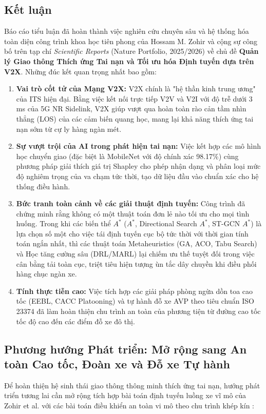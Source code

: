 \documentclass[a4paper]{article}
\begin{document}
\subsection{Kết luận}
Báo cáo tiểu luận đã hoàn thành việc nghiên cứu chuyên sâu và hệ thống hóa toàn diện công trình khoa học tiên phong của Hossam M. Zohir và cộng sự công bố trên tạp chí \textit{Scientific Reports} (Nature Portfolio, 2025/2026) về chủ đề \textbf{Quản lý Giao thông Thích ứng Tai nạn và Tối ưu hóa Định tuyến dựa trên V2X}. Những đúc kết quan trọng nhất bao gồm:
\begin{enumerate}
    \item \textbf{Vai trò cốt tử của Mạng V2X:} V2X chính là "hệ thần kinh trung ương" của ITS hiện đại. Bằng việc kết nối trực tiếp V2V và V2I với độ trễ dưới 3 ms của 5G NR Sidelink, V2X giúp vượt qua hoàn toàn rào cản tầm nhìn thẳng (LOS) của các cảm biến quang học, mang lại khả năng thích ứng tai nạn sớm từ cự ly hàng ngàn mét.
    \item \textbf{Sự vượt trội của AI trong phát hiện tai nạn:} Việc kết hợp các mô hình học chuyển giao (đặc biệt là MobileNet với độ chính xác 98.17\%) cùng phương pháp giải thích giá trị Shapley cho phép nhận dạng và phân loại mức độ nghiêm trọng của va chạm tức thời, tạo dữ liệu đầu vào chuẩn xác cho hệ thống điều hành.
    \item \textbf{Bức tranh toàn cảnh về các giải thuật định tuyến:} Công trình đã chứng minh rằng không có một thuật toán đơn lẻ nào tối ưu cho mọi tình huống. Trong khi các biến thể $A^*$ ($A^*$, Directional Search $A^*$, ST-GCN $A^*$) là lựa chọn số một cho việc tái định tuyến cục bộ tức thời với thời gian tính toán ngắn nhất, thì các thuật toán Metaheuristics (GA, ACO, Tabu Search) và Học tăng cường sâu (DRL/MARL) lại chiếm ưu thế tuyệt đối trong việc cân bằng tải toàn cục, triệt tiêu hiện tượng ùn tắc dây chuyền khi điều phối hàng chục ngàn xe.
    \item \textbf{Tính thực tiễn cao:} Việc tích hợp các giải pháp phòng ngừa dồn toa cao tốc (EEBL, CACC Platooning) và tự hành đỗ xe AVP theo tiêu chuẩn ISO 23374 đã làm hoàn thiện chu trình an toàn của phương tiện từ đường cao tốc tốc độ cao đến các điểm đỗ xe đô thị.
\end{enumerate}

\subsection{Phương hướng Phát triển: Mở rộng sang An toàn Cao tốc, Đoàn xe và Đỗ xe Tự hành}
Để hoàn thiện hệ sinh thái giao thông thông minh thích ứng tai nạn, hướng phát triển tương lai cần mở rộng tích hợp bài toán định tuyến luồng xe vĩ mô của Zohir et al. với các bài toán điều khiển an toàn vi mô theo chu trình khép kín \cite{other_references}:
\end{document}
